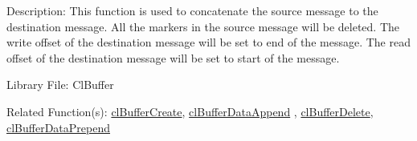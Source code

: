 \begin{Desc}
\item[Description:]This function is used to concatenate the source message to the destination message. All the markers in the source message will be 
deleted. The write offset of the destination message will be set to end of the message. The read offset of the destination message will be set to 
start of the message.\end{Desc}
\begin{Desc}
\item[Library File:]Cl\-Buffer\end{Desc}
\begin{Desc}
\item[Related Function(s):]\hyperlink{pagebuf103}{cl\-Buffer\-Create}, \hyperlink{pagebuf114}{cl\-Buffer\-Data\-Append} , 
\hyperlink{pagebuf105}{cl\-Buffer\-Delete}, \hyperlink{pagebuf115}{cl\-Buffer\-Data\-Prepend} \end{Desc}


\newpage
